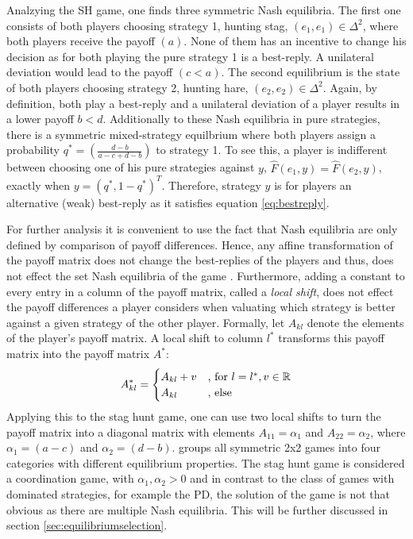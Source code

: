 Analzying the SH game, one finds three symmetric Nash equilibria.
The first one consists of both players choosing strategy 1, 
hunting stag, $(e_1,e_1) \in
\Delta^2$, where both players receive the payoff $(a)$. 
None of them has an incentive to change his decision as for both
playing the pure strategy 1 is a best-reply. A unilateral deviation would 
lead to the payoff $(c < a)$.
The second equilibrium is the state of 
both players choosing strategy 2, hunting hare, $(e_2,e_2)
\in \Delta^2$. Again, by definition, both play a best-reply and a unilateral 
deviation of a player results in a lower payoff $b<d$.
Additionally to these Nash equilibria in pure strategies, there is a symmetric
mixed-strategy equilbrium where both players assign a probability 
$q^*=\left(\frac{d-b}{a-c+d-b}\right)$ to strategy 1. 
To see this, a player is indifferent between choosing one of his pure
strategies against $y$, $\hat{F}(e_1,y) = \hat{F}(e_2,y)$, exactly
when $y=(q^*,1-q^*)^T$. Therefore, strategy $y$ is for players an alternative
(weak) best-reply as it satisfies equation \eqref{eq:bestreply}.

For further analysis it is convenient to use the fact that Nash equilibria 
are only defined by comparison of payoff differences. 
Hence, any affine transformation of the payoff matrix does not change the 
best-replies of the players and thus, does not effect the set Nash equilibria 
of the game \parencite[17-19]{weibull_evolutionary_1997}. 
Furthermore, adding a constant to every entry in a 
column of the payoff matrix, 
called a \textit{local shift}, does not effect the payoff differences
a player considers when valuating which strategy is better against a given
strategy of the other player.
Formally, let $A_{kl}$ denote the elements of the player's payoff matrix. 
A local shift to column $l^*$ transforms this payoff matrix into the payoff 
matrix $A^*$:
\begin{align*}
        A^*_{kl} =
        \begin{cases}
                A_{kl} + v & \text{,\ for}\ l=l^*, v \in \mathbb{R} \\
                A_{kl} & \text{,\ else}
        \end{cases}
\end{align*}
Applying this to the stag hunt game, one can use two local shifts to turn 
the payoff matrix into a diagonal matrix with elements $A_{11}=\alpha_1$ 
and $A_{22}=\alpha_2$, where $\alpha_1=(a-c)$ and $\alpha_2=(d-b)$. 
\textcite[28]{weibull_evolutionary_1997} groups all symmetric 2x2 games into 
four categories with different equilibrium properties. 
The stag hunt game is considered a coordination 
game, with $\alpha_1, \alpha_2 > 0$ and in contrast to the class of games
with dominated strategies, for example the PD, the solution of the game
is not that obvious as there are multiple Nash equilibria.
This will be further discussed in section \ref{sec:equilibriumselection}.


